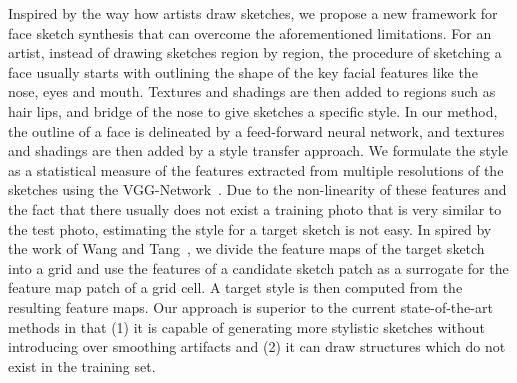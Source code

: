 \documentclass[10pt,twocolumn,letterpaper]{article}
\begin{document}
Inspired by the way how artists draw sketches, we propose a new framework for face sketch synthesis that can overcome the aforementioned limitations. For an artist, instead of drawing sketches region by region, the procedure of sketching a face usually starts with outlining the shape of the key facial features like the nose, eyes and mouth. Textures and shadings are then added to regions such as hair lips, and bridge of the nose to give sketches a specific style. In our method, the outline of a face is delineated by a feed-forward neural network, and textures and shadings are then added by a style transfer approach.  We formulate the style as a statistical measure of the features extracted from multiple resolutions of the sketches using the VGG-Network~\cite{simonyan2014very}. Due to the non-linearity of these features and the fact that there usually does not exist a training photo that is very similar to the test photo, estimating the style for a target sketch is not easy. In spired by the work of Wang and Tang~\cite{wang2009face}, we divide the feature maps of the target sketch into a grid and use the features of a candidate sketch patch as a surrogate for the feature map patch of a grid cell. A target style is then computed from the resulting feature maps. Our approach is superior to the current state-of-the-art methods in that (1) it is capable of generating more stylistic sketches without introducing over smoothing artifacts and (2) it can draw structures which do not exist in the training set.\par
\end{document}
